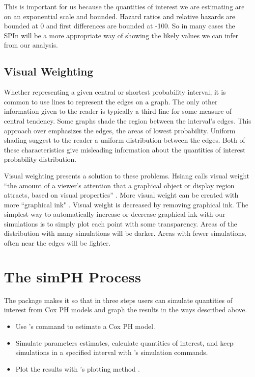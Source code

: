 \documentclass[nojss]{jss}\usepackage{graphicx, color}
\begin{document}
This is important for us because the quantities of interest we are estimating are on an exponential scale and bounded. Hazard ratios and relative hazards are bounded at 0 and first differences are bounded at -100. So in many cases the SPIn will be a more appropriate way of showing the likely values we can infer from our analysis. 


\subsection{Visual Weighting}

Whether representing a given central or shortest probability interval, it is common to use lines to represent the edges on a graph. The only other information given to the reader is typically a third line for some measure of central tendency. Some graphs shade the region between the interval's edges. This approach over emphasizes the edges, the areas of lowest probability. Uniform shading suggest to the reader a uniform distribution between the edges. Both of these characteristics give misleading information about the quantities of interest probability distribution.

Visual weighting presents a solution to these problems. Hsiang calls visual weight ``the amount of a viewer's attention that a graphical object or display region attracts, based on visual properties'' \cite[3]{Hsiang2012}. More visual weight can be created with more ``graphical ink" \citep{Tufte2001}. Visual weight is decreased by removing graphical ink. The simplest way to automatically increase or decrease graphical ink with our simulations is to simply plot each point with some transparency. Areas of the distribution with many simulations will be darker. Areas with fewer simulations, often near the edges will be lighter. 


\section{The simPH Process}

The  package makes it so that in three steps users can simulate quantities of interest from Cox PH models and graph the results in the ways described above.

\begin{itemize}
	\item Use 's  command to estimate a Cox PH model.
	\item Simulate parameters estimates, calculate quantities of interest, and keep simulations in a specified interval with 's simulation commands.
	\item Plot the results with 's plotting method .
\end{itemize}
\end{document}
